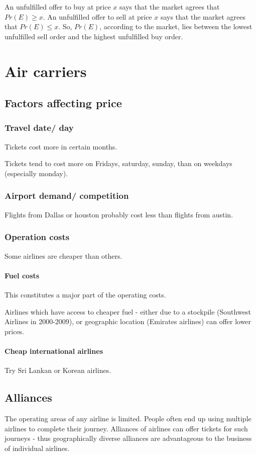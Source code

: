 \documentclass[oneside, article]{memoir}
\begin{document}
An unfulfilled offer to buy at price $x$ says that the market agrees that $Pr(E) \geq x$. An unfulfilled offer to sell at price $x$ says that the market agrees that $Pr(E) \leq x$. So, $Pr(E)$, according to the market, lies between the lowest unfulfilled sell order and the highest unfulfilled buy order.

\chapter{Air carriers}
\section{Factors affecting price}
\subsection{Travel date/ day}
Tickets cost more in certain months.

Tickets tend to cost more on Fridays, saturday, sunday, than on weekdays (especially monday).

\subsection{Airport demand/ competition}
Flights from Dallas or houston probably cost less than flights from austin.

\subsection{Operation costs}
Some airlines are cheaper than others.

\subsubsection{Fuel costs}
This constitutes a major part of the operating costs.

Airlines which have access to cheaper fuel - either due to a stockpile (Southwest Airlines in 2000-2009), or geographic location (Emirates airlines) can offer lower prices.

\subsubsection{Cheap international airlines}
Try Sri Lankan or Korean airlines. 

\section{Alliances}
The operating areas of any airline is limited. People often end up using multiple airlines to complete their journey. Alliances of airlines can offer tickets for such journeys - thus geographically diverse alliances are advantageous to the business of individual airlines.
\end{document}

